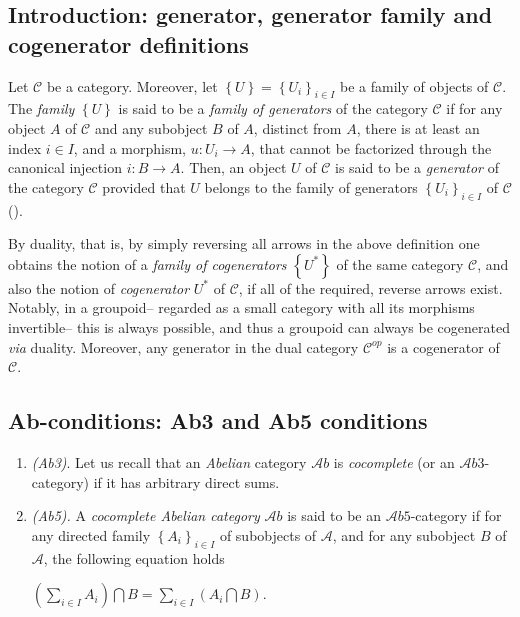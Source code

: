 \documentclass[12pt]{article}
\theoremstyle{plain}
\theoremstyle{definition}
\numberwithin{equation}{section}
\newcommand{\<}{{\langle}}
\begin{document}
\subsection{Introduction: generator, generator family and cogenerator definitions}

 Let $\mathcal{C}$ be a category. Moreover, let $\left\{U\right\}= \left\{U_i\right\}_{i \in I}$ be a family of objects of $\mathcal{C}$. The \emph{family} $\left\{U\right\}$ is said to be a \emph{family of generators} of the category $\mathcal{C}$ if for any object $A$ of $\mathcal{C}$ and any subobject $B$ of $A$, distinct from $A$, there is at least an index $i \in I$, and a morphism, $u : U_i \to A$, that cannot be factorized through the canonical injection $i : B \to A$. Then, an object $U$ of $\mathcal{C}$ is said to be a \emph{generator} of the category $\mathcal{C}$ provided that $U$ belongs to the family of generators $\left\{U_i\right\}_{i \in I}$ of $\mathcal{C}$ (\cite{NP65}).

 By duality, that is, by simply reversing all arrows in the above definition one obtains the notion of a 
{\em family of cogenerators} $\left\{U^*\right\}$ of the same category $\mathcal{C}$, and also the notion of {\em cogenerator} $U^*$ of $\mathcal{C}$, if all of the required, reverse arrows exist. Notably, in a groupoid-- regarded as a small category with all its morphisms invertible-- this is always possible, and thus a groupoid can always be cogenerated {\em via} duality. Moreover, any generator in the dual category $\mathcal{C}^{op}$ is a cogenerator of $\mathcal{C}$.  


\subsection{Ab-conditions: Ab3 and Ab5 conditions}
\begin{enumerate}

\item \emph{(Ab3)}. Let us recall that an \emph{Abelian} category $\mathcal{A}b$ is \emph{cocomplete} 
(or an $\mathcal{A}b3$-category) if it has arbitrary direct sums. 

\item \emph{(Ab5).}  A \emph{cocomplete Abelian category} $\mathcal{A}b$ is said to be an $\mathcal{A}b5$-category if for any directed family $\left\{A_i\right\}_{i \in I}$ of subobjects of $\mathcal{A}$, and for any subobject $B$ of 
$\mathcal{A}$, the following equation holds

$(\sum_{i \in I}A_i) \bigcap B = \sum_{i \in I} (A_i \bigcap B).$ 

\end{enumerate}
\end{document}
